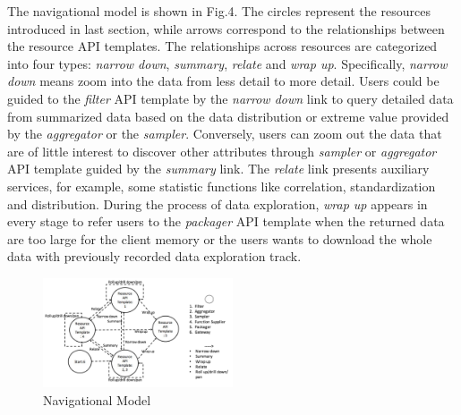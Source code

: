 \documentclass[10pt, conference, compsocconf]{IEEEtran}
\begin{document}
The navigational model is shown in Fig.4. The circles represent the resources introduced in last section, while arrows correspond to the relationships between the resource API templates. The relationships across resources are categorized into four types: \textit{narrow down}, \textit{summary}, \textit{relate} and \textit{wrap up}. Specifically, \textit{narrow down} means zoom into the data from less detail to more detail. Users could be guided to the \textit{filter} API template by the \textit{narrow down} link to query detailed data from summarized data based on the data distribution or extreme value provided by the \textit{aggregator} or the \textit{sampler}. Conversely, users can zoom out the data that are of little interest to discover other attributes through \textit{sampler} or \textit{aggregator} API template guided by the \textit{summary} link. The \textit{relate} link presents auxiliary services, for example, some statistic functions like correlation, standardization and distribution. During the process of data exploration, \textit{wrap up} appears in every stage to refer users to the \textit{packager} API template when the returned data are too large for the client memory or the users wants to download the whole data with previously recorded data exploration track.
\begin{figure}
	\centering
	\includegraphics[width=0.5\textwidth]{navigationalModel.pdf}
	\caption{Navigational Model}
	\label{fig.4}
\end{figure}
\end{document}
